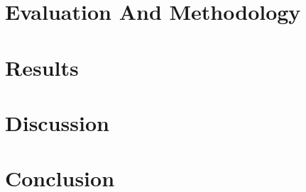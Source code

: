 \documentclass{report}
\begin{document}
\chapter{Evaluation And Methodology}


\chapter{Results}


\chapter{Discussion}


\chapter{Conclusion}


\newpage

%  
% 
\end{document}
